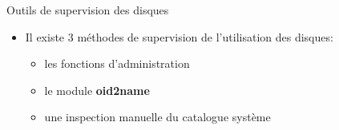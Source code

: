 \begin{frame}{Outils de supervision des disques}

\begin{itemize}

   \item Il existe 3 méthodes de supervision de l'utilisation des disques:
   \begin{itemize}
      \item les fonctions d'administration
      \item le module \textbf{oid2name}
      \item une inspection manuelle du catalogue système
   \end{itemize}

\end{itemize}

\begin{toile}
\end{toile}

\end{frame}


